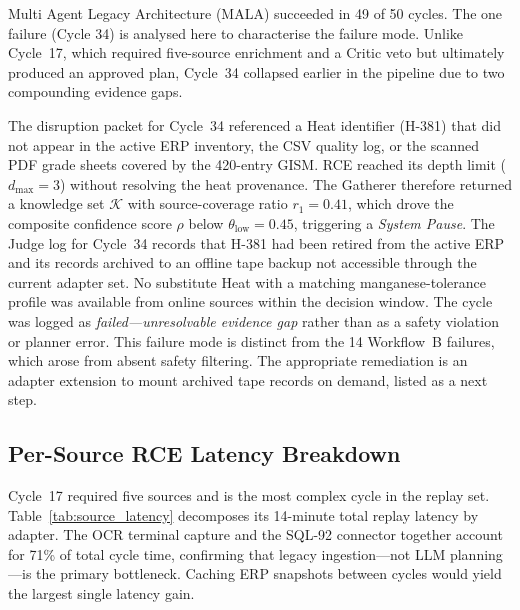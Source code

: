 \documentclass[conference]{IEEEtran}
\newcommand{\MALA}{Multi Agent Legacy Architecture (MALA)}
\begin{document}
\MALA{} succeeded in 49 of 50 cycles. The one failure (Cycle 34) is analysed here to characterise the failure mode. Unlike Cycle~17, which required five-source enrichment and a Critic veto but ultimately produced an approved plan, Cycle~34 collapsed earlier in the pipeline due to two compounding evidence gaps.

The disruption packet for Cycle~34 referenced a Heat identifier (H-381) that did not appear in the active ERP inventory, the CSV quality log, or the scanned PDF grade sheets covered by the 420-entry GISM. RCE reached its depth limit ($d_{\max} = 3$) without resolving the heat provenance. The Gatherer therefore returned a knowledge set $\mathcal{K}$ with source-coverage ratio $r_1 = 0.41$, which drove the composite confidence score $\rho$ below $\theta_{\text{low}} = 0.45$, triggering a \emph{System Pause}. The Judge log for Cycle~34 records that H-381 had been retired from the active ERP and its records archived to an offline tape backup not accessible through the current adapter set. No substitute Heat with a matching manganese-tolerance profile was available from online sources within the decision window. The cycle was logged as \emph{failed---unresolvable evidence gap} rather than as a safety violation or planner error. This failure mode is distinct from the 14 Workflow~B failures, which arose from absent safety filtering. The appropriate remediation is an adapter extension to mount archived tape records on demand, listed as a next step.

\subsection{Per-Source RCE Latency Breakdown}

Cycle~17 required five sources and is the most complex cycle in the replay set. Table~\ref{tab:source_latency} decomposes its 14-minute total replay latency by adapter. The OCR terminal capture and the SQL-92 connector together account for 71\% of total cycle time, confirming that legacy ingestion---not LLM planning---is the primary bottleneck. Caching ERP snapshots between cycles would yield the largest single latency gain.
\end{document}
